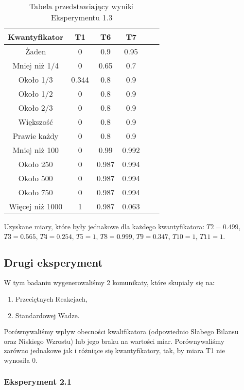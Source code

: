 \documentclass{classrep}
\begin{document}
\begin{table}[H]
	\centering
	\begin{tabular}{c c c c c c} 
		\hline
		\textbf{Kwantyfikator} & \textbf{T1} & \textbf{T6} & \textbf{T7}\\ [0.5ex] 
		\hline
		\hline 
		Żaden & 0 & 0.9 & 0.95 \\ 
		Mniej niż 1/4 & 0 & 0.65 & 0.7 \\
		Około 1/3 & 0.344 & 0.8 & 0.9 \\
		Około 1/2 & 0 & 0.8 & 0.9 \\
		Około 2/3 & 0 & 0.8 & 0.9 \\
		Większość & 0 & 0.8 & 0.9  \\
		Prawie każdy & 0 & 0.8 & 0.9  \\
		Mniej niż 100 & 0 & 0.99 & 0.992  \\
		Około 250 & 0 & 0.987 & 0.994  \\
		Około 500 & 0 & 0.987 & 0.994  \\
		Około 750 & 0 & 0.987 & 0.994  \\
		Więcej niż 1000 & 1 & 0.987 & 0.063  \\
		\hline
	\end{tabular}
	\caption{Tabela przedstawiający wyniki Eksperymentu 1.3}
\end{table}

Uzyskane miary, które były jednakowe dla każdego kwantyfikatora: $T2 = 0.499$, $T3 = 0.565$, $T4 = 0.254$, $T5 = 1$, $T8 = 0.999$, $T9 = 0.347$, $T10 = 1$, $T11 = 1$.

\subsection{Drugi eksperyment}

W tym badaniu wygenerowaliśmy 2 komunikaty, które skupiały się na:
\begin{enumerate}
	\item Przeciętnych Reakcjach,
	\item Standardowej Wadze.
\end{enumerate}
Porównywaliśmy wpływ obecności kwalifikatora (odpowiednio Słabego Bilansu oraz Niskiego Wzrostu) lub jego braku na wartości miar. Porównywaliśmy zarówno jednakowe jak i różniące się kwantyfikatory, tak, by miara T1 nie wynosiła 0.

\subsubsection{Eksperyment 2.1}
\end{document}
